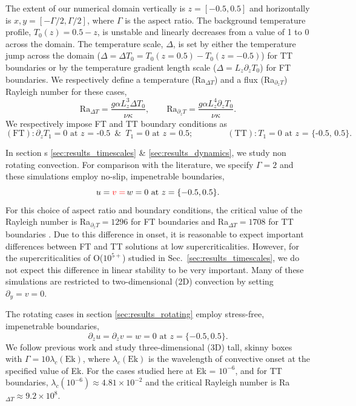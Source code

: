 \documentclass[aps, pre, onecolumn, nofootinbib, notitlepage, groupedaddress, amsfonts, amssymb, amsmath, longbibliography, superscriptaddress]{revtex4-1}
\newcommand{\ea}[1]{{\color{red} #1}}
\begin{document}
The extent of our numerical domain vertically is $z = [-0.5, 0.5]$ and horizontally is $x, y = [-\Gamma/2, \Gamma/2]$, where $\Gamma$ is the aspect ratio.
The \ea{background} temperature profile, $T_0(z) = 0.5 - z$, is unstable and linearly decreases from a value of 1 to 0 across the domain. 
The temperature scale, $\Delta$, is set by \ea{either} the temperature jump across the domain ($\Delta = \Delta T_0 =  T_0(z=0.5)-T_0(z=-0.5)$) for TT boundaries or by the temperature gradient length scale ($\Delta = L_z \partial_z T_0$) for FT boundaries.
We respectively define a temperature (Ra$_{\Delta T}$) and a flux (Ra$_{\partial_z T}$) Rayleigh number for these cases,
\begin{equation}
\text{Ra}_{\Delta T} = \frac{g \alpha L_z^3 \Delta T_0}{\nu\kappa}, \qquad 
\text{Ra}_{\partial_z T} = \frac{g \alpha L_z^4 \partial_z T_0}{\nu\kappa}.
\end{equation}
We respectively impose FT and TT boundary conditions as
\begin{equation}
(\text{FT}): \partial_z T_1 = 0 \text{ at $z$ = -0.5} \,\,\,\&\,\,\, T_1 = 0 \text{ at $z$ = 0.5};\qquad\qquad
(\text{TT}): T_1 = 0 \text{ at $z$ = \{-0.5, 0.5\}}.
\end{equation}

In section\ea{s} \ref{sec:results_timescales}\ea{\& \ref{sec:results_dynamics}}, we study \ea{non rotating convection}.
For comparison with the literature, we specify $\Gamma = 2$ and these simulations employ no-slip, impenetrable boundaries,
\begin{equation}
u = \ea{v =}\, w = 0 \, \, \text{at}\,\,z = \{-0.5, 0.5\}.
\label{eqn:vel_bcs}
\end{equation}
For this choice of \ea{aspect ratio and} boundary conditions, the critical value of the Rayleigh number is Ra$_{\partial_z T} = 1296$ for FT boundaries and Ra$_{\Delta T} = 1708$ for TT boundaries \cite{goluskin2016}.
Due to this difference in onset, it is reasonable to expect important differences between FT and TT solutions at low supercriticalities.
However, for the supercriticalities of O($10^{5+}$) studied in Sec.~\ref{sec:results_timescales}, we do not expect this difference in linear stability to be very important.
\ea{Many of these simulations are restricted to} two-dimensional (2D) convection \ea{by setting} $\partial_y = v = 0$.

The rotating cases in section \ref{sec:results_rotating} employ stress-free, impenetrable boundaries,
\begin{equation}
\partial_z u = \partial_z v = w = 0 \, \, \text{at}\,\,z = \{-0.5, 0.5\}.
\label{eqn:vel_bcs}
\end{equation}
We follow previous work  \cite{stellmach&all2014} and study three-dimensional (3D) tall, skinny boxes with $\Gamma = 10\lambda_c(\text{Ek})$, where $\lambda_c(\text{Ek})$ is the wavelength of convective onset at the specified value of Ek. 
For the cases studied here at Ek = $10^{-6}$, and for TT boundaries, $\lambda_c(10^{-6}) \approx 4.81 \times 10^{-2}$ and the critical Rayleigh number is Ra$_{\Delta T} \approx 9.2 \times 10^{8}$.
\end{document}
